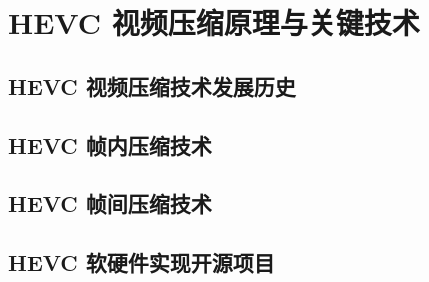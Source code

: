 \chapter{HEVC 视频压缩原理与关键技术}
\label{cha:c2}

\section{HEVC 视频压缩技术发展历史}

\section{HEVC 帧内压缩技术}

\section{HEVC 帧间压缩技术}

\section{HEVC 软硬件实现开源项目}